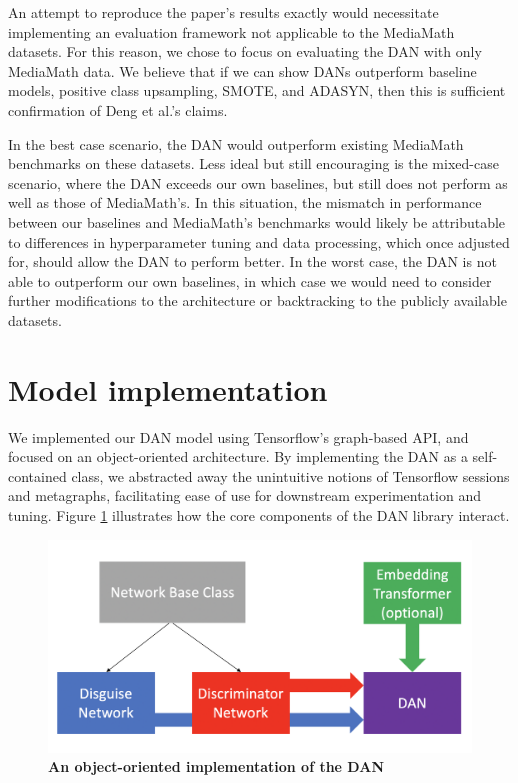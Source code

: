 \documentclass{proc}
\begin{document}
An attempt to reproduce the paper's results exactly would necessitate implementing an evaluation framework not applicable to the MediaMath datasets. For this reason, we chose to focus on evaluating the DAN with only MediaMath data. We believe that if we can show DANs outperform baseline models, positive class upsampling, SMOTE, and ADASYN, then this is sufficient confirmation of Deng et al.'s claims.

In the best case scenario, the DAN would outperform existing MediaMath benchmarks on these datasets. Less ideal but still encouraging is the mixed-case scenario, where the DAN exceeds our own baselines, but still does not perform as well as those of MediaMath's. In this situation, the mismatch in performance between our baselines and MediaMath's benchmarks would likely be attributable to differences in hyperparameter tuning and data processing, which once adjusted for, should allow the DAN to perform better. In the worst case, the DAN is not able to outperform our own baselines, in which case we would need to consider further modifications to the architecture or backtracking to the publicly available datasets.

\section{Model implementation}

We implemented our DAN model using Tensorflow's graph-based API, and focused on an object-oriented architecture. By implementing the DAN as a self-contained class, we abstracted away the unintuitive notions of Tensorflow sessions and metagraphs, facilitating ease of use for downstream experimentation and tuning. Figure \ref{fig:dan-implementation} illustrates how the core components of the DAN library interact.

\begin{figure}[h!]
		\includegraphics*[scale=0.28]{../figures/dan-implementation.png}
		\caption{\textbf{An object-oriented implementation of the DAN}}
		\label{fig:dan-implementation}
\end{figure}
\end{document}
